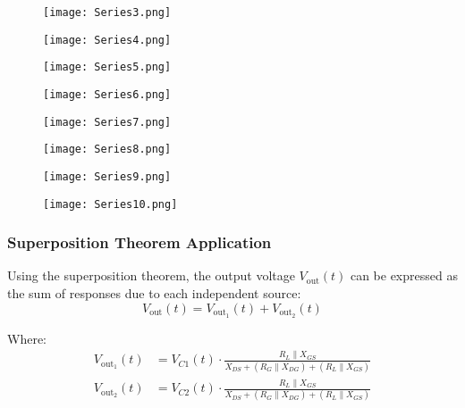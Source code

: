 \documentclass[a4paper,9pt,twoside,openany,twocolumn]{memoir}
\begin{document}
\begin{figure}[H]
    \centering
    \texttt{[image: Series3.png]}
\end{figure}

\begin{figure}[H]
    \centering
    \texttt{[image: Series4.png]}
\end{figure}

\begin{figure}[H]
    \centering
    \texttt{[image: Series5.png]}
\end{figure}

\begin{figure}[H]
    \centering
    \texttt{[image: Series6.png]}
\end{figure}

\begin{figure}[H]
    \centering
    \texttt{[image: Series7.png]}
\end{figure}

\begin{figure}[H]
    \centering
    \texttt{[image: Series8.png]}
\end{figure}

\begin{figure}[H]
    \centering
    \texttt{[image: Series9.png]}
\end{figure}

\begin{figure}[H]
    \centering
    \texttt{[image: Series10.png]}
\end{figure}


\subsubsection{Superposition Theorem Application}
Using the superposition theorem, the output voltage \( V_{\text{out}}(t) \) can be expressed as the sum of responses due to each independent source:
\begin{equation}
V_{\text{out}}(t) = V_{\text{out}_1}(t) + V_{\text{out}_2}(t)
\end{equation}

Where:
\begin{align}
V_{\text{out}_1}(t) &= V_{C1}(t) \cdot \frac{R_L \parallel X_{GS}}{X_{DS} + (R_G \parallel X_{DG}) + (R_L \parallel X_{GS})} \\
V_{\text{out}_2}(t) &= V_{C2}(t) \cdot \frac{R_L \parallel X_{GS}}{X_{DS} + (R_G \parallel X_{DG}) + (R_L \parallel X_{GS})}
\end{align}
\end{document}
